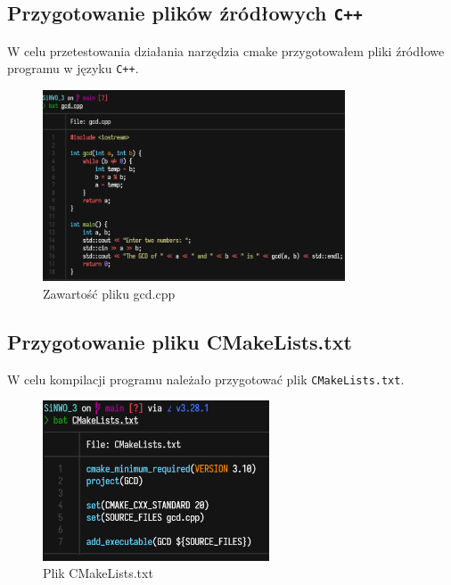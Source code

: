 \documentclass[a4paper,12pt]{article}
\begin{document}
\subsection{Przygotowanie plików źródłowych \texttt{C++}}
W celu przetestowania działania narzędzia cmake przygotowałem pliki źródłowe programu w języku \verb!C++!.
\begin{figure}[ht]
    \centering
    \includegraphics[width=0.8\textwidth]{images/code.png}
    \caption{Zawartość pliku gcd.cpp}
\end{figure}

\newpage
\clearpage

\subsection{Przygotowanie pliku CMakeLists.txt}
W celu kompilacji programu należało przygotować plik \verb!CMakeLists.txt!.
\begin{figure}[ht]
    \centering
    \includegraphics[width=0.6\textwidth]{images/cmake.png}
    \caption{Plik CMakeLists.txt}
\end{figure}
\end{document}

